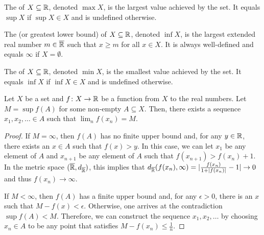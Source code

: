 \begin{definition}
The  of $X\subseteq \mathbb{R}$, denoted $\max X$, is the largest value achieved by the set.
It equals $\sup X$ if $\sup X \in X$ and is undefined otherwise.
\end{definition}

\begin{definition}
The  (or greatest lower bound) of $X\subseteq \mathbb{R}$, denoted $\inf X$, is the largest extended real number $m \in \overline{\mathbb{R}}$ such that $x\geq m$ for all $x\in X$.
It is always well-defined and equals $\infty$ if $X=\emptyset$.
\end{definition}

\begin{definition}
The  of $X\subseteq \mathbb{R}$, denoted $\min X$, is the smallest value achieved by the set.
It equals $\inf X$ if $\inf X \in X$ and is undefined otherwise.
\end{definition}

\begin{lemma}
\label{lem:SupremumSequence}
Let $X$ be a set and $f \colon X\rightarrow \mathbb{R}$ be a function from $X$ to the real numbers.
Let $M = \sup f(A)$ for some non-empty $A \subseteq X$.
Then, there exists a sequence $x_1,x_2,\ldots \in A$ such that $\lim_n f(x_n) = M$.
\end{lemma}
\begin{proof}
If $M=\infty$, then $f(A)$ has no finite upper bound and, for any $y\in \mathbb{R}$, there exists an $x\in A$ such that $f(x)>y$.
In this case, we can let $x_1$ be any element of $A$ and $x_{n+1}$ be any element of $A$ such that $f(x_{n+1}) > f(x_n) + 1$.
In the metric space $(\overline{\mathbb{R}},d_{\overline{\mathbb{R}}})$, this implies that $d_{\overline{\mathbb{R}}}(f(x_n),\infty) = |\frac{f(x_n)}{1+|f(x_n)|} - 1| \to 0$ and thus $f(x_n) \to \infty$.

If $M<\infty$, then $f(A)$ has a finite upper bound and, for any $\epsilon >0$, there is an $x$ such that $M-f(x)<\epsilon$.
Otherwise, one arrives at the contradiction $\sup f(A) < M$.
Therefore, we can construct the sequence $x_1,x_2,\ldots$ by choosing $x_n\in A$ to be any point that satisfies $M-f(x_n)\leq \frac{1}{n}$.
\end{proof}

